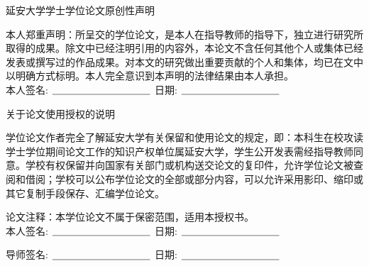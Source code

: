 

\newpage
\vspace*{20pt}
\begin{center}
	{\heiti{}延安大学学士学位论文原创性声明}
\end{center}
\par\vspace*{10pt}
\renewcommand{\baselinestretch}{1.5}

{%

本人郑重声明：所呈交的学位论文，是本人在指导教师的指导下，独立进行研究所取得的成果。除文中已经注明引用的内容外，本论文不含任何其他个人或集体已经发表或撰写过的作品成果。对本文的研究做出重要贡献的个人和集体，均已在文中以明确方式标明。本人完全意识到本声明的法律结果由本人承担。\\[5mm]

\hspace*{1cm}本人签名: $\underline{\hspace{3.5cm}}$
\hspace{2cm}日期: $\underline{\hspace{3.5cm}}$\hfill\par}
\vskip20mm

\begin{center}
	{\heiti{}关于论文使用授权的说明}
\end{center}
\par\vspace*{10pt}

{%
	
学位论文作者完全了解延安大学有关保留和使用论文的规定，即：本科生在校攻读学士学位期间论文工作的知识产权单位属延安大学，学生公开发表需经指导教师同意。学校有权保留并向国家有关部门或机构送交论文的复印件，允许学位论文被查阅和借阅；学校可以公布学位论文的全部或部分内容，可以允许采用影印、缩印或其它复制手段保存、汇编学位论文。

论文注释：本学位论文不属于保密范围，适用本授权书。\\[5mm]
	
	\hspace*{1cm}本人签名: $\underline{\hspace{3.5cm}}$
	\hspace{2cm}日期: $\underline{\hspace{3.5cm}}$\hfill\par 
	\vskip5mm
	\hspace*{1cm}导师签名: $\underline{\hspace{3.5cm}}$
	\hspace{2cm}日期: $\underline{\hspace{3.5cm}}$\hfill\par}
\baselineskip=18pt  %





